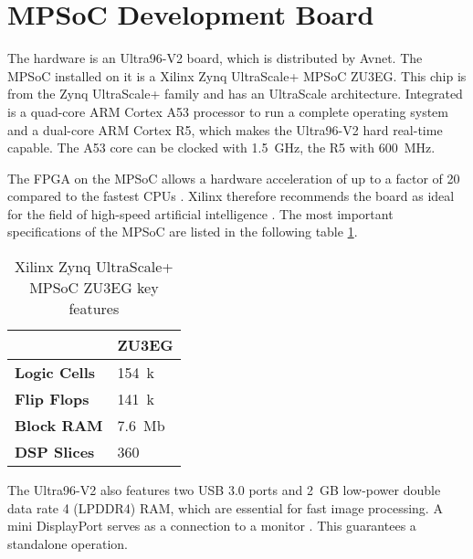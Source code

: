 \section{MPSoC Development Board}
\label{sec:board}

The hardware is an Ultra96-V2 board, which is distributed by Avnet.
The MPSoC installed on it is a Xilinx Zynq UltraScale+ MPSoC ZU3EG.
This chip is from the Zynq UltraScale+ family and has an UltraScale architecture.
Integrated is a quad-core ARM Cortex A53 processor to run a complete operating system and a dual-core ARM Cortex R5, which makes the Ultra96-V2 hard real-time capable.
The A53 core can be clocked with \SI{1.5}{GHz}, the R5 with \SI{600}{MHz}.

The FPGA on the MPSoC allows a hardware acceleration of up to a factor of 20 compared to the fastest CPUs \cite{acceleration_xilinx}.
Xilinx therefore recommends the board as ideal for the field of high-speed artificial intelligence \cite{ai_resources_xilinx}.
The most important specifications of the MPSoC are listed in the following table \ref{tab:specs_MPSoC}.

\begin{table}[h]
	\caption{Xilinx Zynq UltraScale+ MPSoC ZU3EG key features \cite{xilinx_zynq}}
	\label{tab:specs_MPSoC}
	\centering
	\begin{tabular}{ll}
		\toprule
		& \textbf{ZU3EG} \\
		\midrule
		\textbf{Logic Cells} & \SI{154}{k} \\
		\textbf{Flip Flops} & \SI{141}{k} \\
		\textbf{Block RAM} & \SI{7.6}{Mb} \\
		\textbf{DSP Slices} & 360 \\
		\bottomrule
	\end{tabular}
\end{table}

The Ultra96-V2 also features two USB 3.0 ports and \SI{2}{GB} low-power double data rate 4 (LPDDR4) RAM, which are essential for fast image processing.
A mini DisplayPort serves as a connection to a monitor \cite{avnet_ultra96v2}.
This guarantees a standalone operation.
